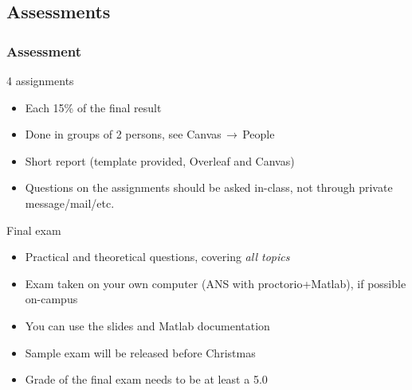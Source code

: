 \subsection{Assessments}
\begin{frame}
 \frametitle{Assessment}
 \begin{block}{4 assignments}
  \begin{itemize}
    \item Each 15\% of the final result
    \item Done in groups of 2 persons, see Canvas$\,\to\,$People
    \item Short report (template provided, Overleaf and Canvas)
    \item Questions on the assignments should be asked in-class, not through private message/mail/etc.
  \end{itemize}   
 \end{block}
 \pause
 \begin{block}{Final exam}
  \begin{itemize}
    \item Practical and theoretical questions, covering \emph{all topics}
    \item Exam taken on your own computer (ANS with proctorio+Matlab), if possible on-campus
    \item You can use the slides and Matlab documentation
    \item Sample exam will be released before Christmas
    \item Grade of the final exam needs to be at least a 5.0
  \end{itemize}   
 \end{block}
\end{frame}

